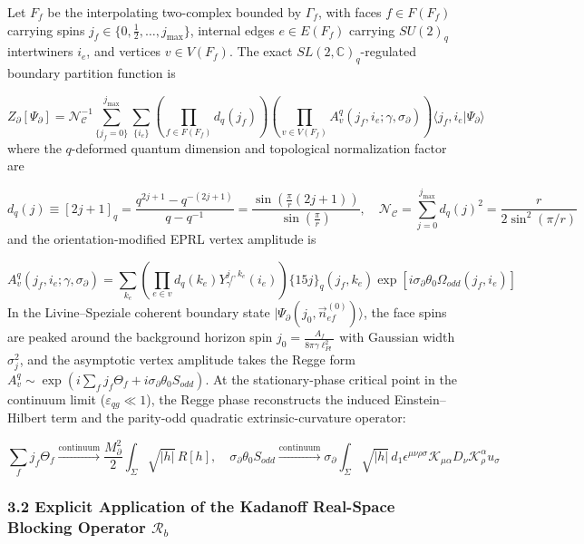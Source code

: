 \documentclass[aps,prd,onecolumn,superscriptaddress,nofootinbib,longbibliography,10pt]{revtex4-2}
\begin{document}
  Let \(F_f\) be the interpolating two-complex bounded by \(\Gamma_f\), with faces \(f \in F(F_f)\) carrying spins \(j_f \in \{0, \frac{1}{2}, \dots, j_{\max}\}\), internal edges \(e \in E(F_f)\) carrying \(SU(2)_q\) intertwiners \(i_e\), and vertices \(v \in V(F_f)\). The exact \(SL(2,\mathbb{C})_q\)-regulated boundary partition function is


  \[ Z_\partial[\Psi_\partial] = \mathcal{N}_{\mathcal{C}}^{-1} \sum_{\{j_f=0\}}^{j_{\max}} \sum_{\{i_e\}} \left( \prod_{f\in F(F_f)} d_q(j_f) \right)\left( \prod_{v\in V(F_f)} A_v^q(j_f, i_e; \gamma, \sigma_\partial) \right)\langle j_f, i_e | \Psi_\partial\rangle \]
  where the \(q\)-deformed quantum dimension and topological normalization factor are


  \[ d_q(j) \equiv [2j+1]_q = \frac{q^{2j+1} - q^{-(2j+1)}}{q - q^{-1}} = \frac{\sin\left(\frac{\pi}{r}(2j+1)\right)}{\sin\left(\frac{\pi}{r}\right)}, \quad \mathcal{N}_{\mathcal{C}} = \sum_{j=0}^{j_{\max}} d_q(j)^2 = \frac{r}{2\sin^2(\pi/r)} \]
  and the orientation-modified EPRL vertex amplitude is


  \[ A_v^q(j_f, i_e; \gamma, \sigma_\partial) = \sum_{k_e}\left(\prod_{e\in v} d_q(k_e) Y_\gamma^{j_f, k_e}(i_e)\right)\{15j\}_q(j_f, k_e)\exp\left[i\sigma_\partial\theta_0\Omega_{odd}(j_f, i_e)\right] \]
  In the Livine–Speziale coherent boundary state \(|\Psi_\partial(j_0, \vec{n}_{ef}^{(0)})\rangle\), the face spins are peaked around the background horizon spin \(j_0 = \frac{A_f}{8\pi\gamma\ell_{Pl}^2}\) with Gaussian width \(\sigma_j^2\), and the asymptotic vertex amplitude takes the Regge form \(A_v^q \sim \exp\left(i\sum_f j_f\Theta_f + i\sigma_\partial\theta_0 S_{odd}\right)\). At the stationary-phase critical point in the continuum limit (\(\varepsilon_{qg} \ll 1\)), the Regge phase reconstructs the induced Einstein–Hilbert term and the parity-odd quadratic extrinsic-curvature operator:


  \[ \sum_f j_f\Theta_f \xrightarrow{\text{continuum}} \frac{M_\partial^2}{2}\int_\Sigma \sqrt{|h|}\,R[h], \quad \sigma_\partial\theta_0 S_{odd} \xrightarrow{\text{continuum}} \sigma_\partial\int_\Sigma \sqrt{|h|}\,d_1\epsilon^{\mu\nu\rho\sigma}\mathcal{K}_{\mu\alpha}D_\nu\mathcal{K}^\alpha_\rho u_\sigma \]
  
  
\subsubsection*{3.2 Explicit Application of the Kadanoff Real-Space Blocking Operator \(\mathcal{R}_b\)}
\end{document}
